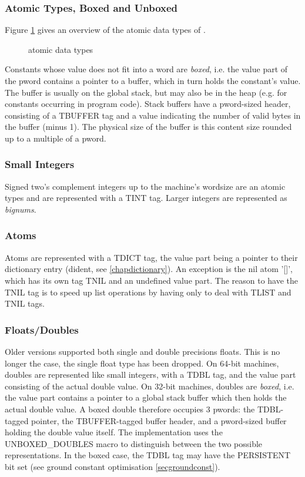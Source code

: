 \subsubsection{Atomic Types, Boxed and Unboxed}
Figure \ref{figatomic} gives an overview of the atomic data types of
{\eclipse}.
\begin{figure}
\label{figatomic}
\caption{{\eclipse} atomic data types}
\end{figure}
Constants whose value does not fit into a word are {\it boxed}, i.e. the
value part of the pword contains a pointer to a buffer, which in turn
holds the constant's value. The buffer  is usually on the global stack,
but may also be in the heap (e.g. for constants  occurring in program code).
Stack buffers have a pword-sized
header, consisting of a TBUFFER  tag and a value indicating the number of
valid bytes in the buffer (minus 1).  The physical size of the buffer is
this content size rounded up to a multiple of a pword.

\subsubsection{Small Integers}
Signed two's complement integers  up to the machine's wordsize are an
atomic types and are represented with a TINT  tag.  Larger integers are
represented as {\em bignums}.

\subsubsection{Atoms}
Atoms  are represented with a TDICT  tag, the value part being a 
pointer to their dictionary entry (dident, see \ref{chapdictionary}).
An exception is the nil atom '[]', which has its own tag TNIL  and
an undefined value part. The reason to have the TNIL tag is to speed
up list operations by having only to deal with TLIST and TNIL tags.

\subsubsection{Floats/Doubles}
Older {\eclipse} versions supported both single and double precisions floats.
This is no longer the case, the single float type has been dropped.
On 64-bit machines, doubles  are represented like small integers, with
a TDBL tag, and the value part consisting of the actual double value.
On 32-bit machines, doubles are {\it boxed}, i.e. the value part contains
a pointer to a global stack buffer which then holds the actual double value.
A boxed double therefore occupies 3 pwords: the TDBL-tagged pointer, the
TBUFFER-tagged buffer header, and a pword-sized buffer holding the double
value itself.
The implementation uses the UNBOXED_DOUBLES  macro to distinguish between
the two possible representations.
In the boxed case, the TDBL tag may have the PERSISTENT  bit set (see
ground constant optimisation \ref{secgroundconst}).

